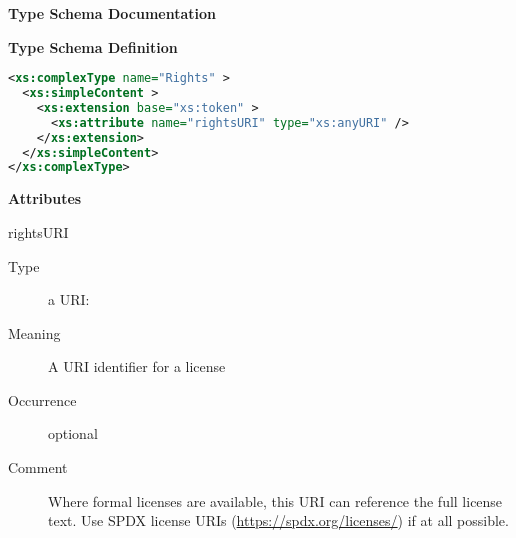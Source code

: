 \documentclass[11pt,a4paper]{ivoa}
\begin{document}
\begin{generated}
\begingroup
        \renewcommand*\descriptionlabel[1]{%
        \hbox to 5.5em{\emph{#1}\hfil}}\vspace{2ex}\noindent\textbf{ Type Schema Documentation}


\vspace{1ex}\noindent\textbf{ Type Schema Definition}

\begin{lstlisting}[language=XML,basicstyle=\footnotesize]
<xs:complexType name="Rights" >
  <xs:simpleContent >
    <xs:extension base="xs:token" >
      <xs:attribute name="rightsURI" type="xs:anyURI" />
    </xs:extension>
  </xs:simpleContent>
</xs:complexType>
\end{lstlisting}

\vspace{0.5ex}\noindent\textbf{ Attributes}

\begingroup\small\begin{bigdescription}
\item[rightsURI]
\begin{description}
\item[Type] a URI: 
\item[Meaning]
                     A URI identifier for a license

\item[Occurrence] optional
\item[Comment]
                     Where formal licenses are available, this URI can
                     reference the full license text.  Use SPDX
                     license URIs (\url{https://spdx.org/licenses/}) if at all
                     possible.

\end{description}


\end{bigdescription}\endgroup

\endgroup
\end{generated}
\end{document}
